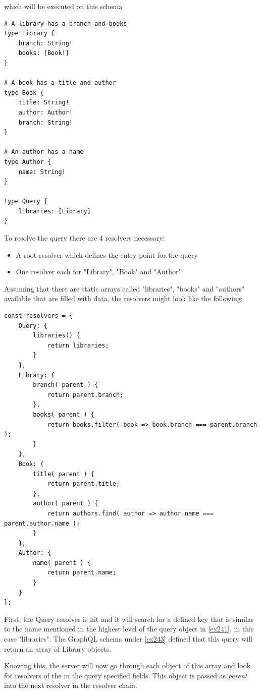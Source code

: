 which will be executed on this schema \citep[with adaptions]{ApolloResChain}
\begin{lstlisting}[caption={Schema Definition},label={ex243}]
# A library has a branch and books 
type Library { 
	branch: String! 
	books: [Book!] 
} 

# A book has a title and author 
type Book { 
	title: String! 
	author: Author! 
	branch: String! 
} 

# An author has a name 
type Author { 
	name: String!
} 

type Query { 
	libraries: [Library] 
}
\end{lstlisting}

\noindent
To resolve the query there are 4 resolvers necessary:
\begin{itemize}
\item A root resolver which defines the entry point for the query
\item One resolver each for "Library", "Book" and "Author"
\end{itemize}

\noindent
Assuming that there are static arrays called "libraries", "books" and "authors" available that are filled with data, the resolvers might look like the following: 
\citep[with adaptions]{ApolloResChain}
\lstset{language=JavaScript}
\begin{lstlisting}[caption={Resolver Definition},label={ex244}]
const resolvers = { 
	Query: { 
		libraries() { 
			return libraries; 
		} 
	}, 
	Library: { 
		branch( parent ) { 
			return parent.branch; 
		}, 
		books( parent ) { 
			return books.filter( book => book.branch === parent.branch ); 
		} 
	}, 
	Book: { 
		title( parent ) { 
			return parent.title; 
		}, 
		author( parent ) { 
			return authors.find( author => author.name === parent.author.name ); 
		} 
	}, 
	Author: { 
		name( parent ) { 
			return parent.name; 
		} 
	}
};
\end{lstlisting}

First, the Query resolver is hit and it will search for a defined key that is similar to the name mentioned in the highest level of the query object in \autoref{ex241}, in this case "libraries". The GraphQL schema under \autoref{ex243} defined that this query will return an array of Library objects.

Knowing this, the server will now go through each object of this array and look for resolvers of the in the query specified fields. This object is passed as \emph{parent} into the next resolver in the resolver chain.

